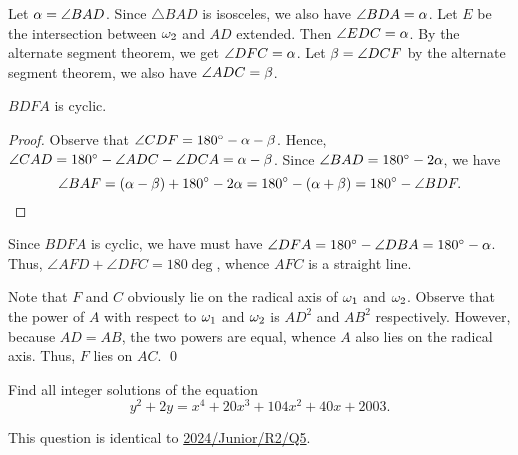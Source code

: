 \begin{solution}
    Let $\alpha = \angle BAD$. Since $\triangle BAD$ is isosceles, we also have $\angle BDA = \alpha$. Let $E$ be the intersection between $\omega_2$ and $AD$ extended. Then $\angle EDC = \alpha$. By the alternate segment theorem, we get $\angle DFC = \alpha$. Let $\beta = \angle DCF$ by the alternate segment theorem, we also have $\angle ADC = \beta$.

    \begin{claim*}
        $BDFA$ is cyclic.
    \end{claim*}
    \begin{proof}
        Observe that $\angle CDF = 180^{\circ} - \alpha - \beta$. Hence, $\angle CAD = 180^{\circ} - \angle ADC - \angle DCA = \alpha - \beta$. Since $\angle BAD = 180^{\circ} - 2\alpha$, we have \[\angle BAF = (\alpha - \beta) + 180^{\circ} - 2\alpha = 180^{\circ} - (\alpha + \beta) = 180^{\circ} - \angle BDF.\]
    \end{proof}
    
    Since $BDFA$ is cyclic, we have must have $\angle DFA = 180^{\circ} - \angle DBA = 180^{\circ} - \alpha$. Thus, $\angle AFD + \angle DFC = 180\deg$, whence $AFC$ is a straight line.
\end{solution}
\begin{solution}[\credit{https://www.youtube.com/watch?v=Mrjm7aWXoNQ}{Way Tan}]
    Note that $F$ and $C$ obviously lie on the radical axis of $\omega_1$ and $\omega_2$. Observe that the power of $A$ with respect to $\omega_1$ and $\omega_2$ is $AD^2$ and $AB^2$ respectively. However, because $AD = AB$, the two powers are equal, whence $A$ also lies on the radical axis. Thus, $F$ lies on $AC$. \qed
\end{solution}

\begin{question}[${(-17, -130), (-17, 128), (7, -130), (7, 128)}$]\label{Q::2024-S-2-2}
    Find all integer solutions of the equation \[y^2 + 2y = x^4 + 20x^3 + 104x^2 + 40x + 2003.\]
\end{question}
\begin{remark}
    This question is identical to \hyperref[Q::2024-J-2-5]{2024/Junior/R2/Q5}.
\end{remark}

